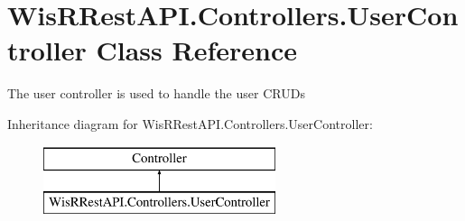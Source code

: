 \hypertarget{class_wis_r_rest_a_p_i_1_1_controllers_1_1_user_controller}{}\section{Wis\+R\+Rest\+A\+P\+I.\+Controllers.\+User\+Controller Class Reference}
\label{class_wis_r_rest_a_p_i_1_1_controllers_1_1_user_controller}


The user controller is used to handle the user C\+R\+U\+D\textquotesingle{}s  


Inheritance diagram for Wis\+R\+Rest\+A\+P\+I.\+Controllers.\+User\+Controller\+:\begin{figure}[H]
\begin{center}
\leavevmode
\includegraphics[height=2.000000cm]{class_wis_r_rest_a_p_i_1_1_controllers_1_1_user_controller}
\end{center}
\end{figure}
